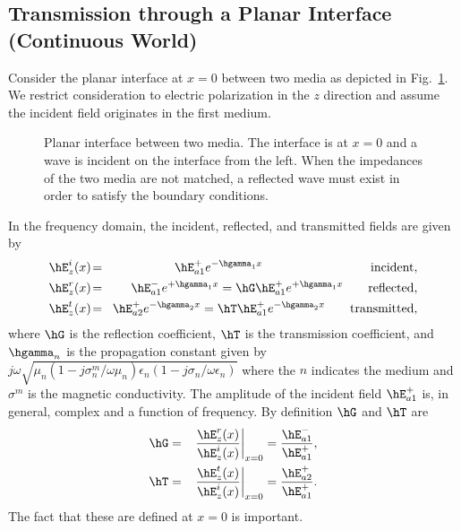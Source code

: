 \subsection[Transmission through Planar Interface]{Transmission through a
Planar Interface (Continuous World) \label{sec:contTrans}}

Consider the planar interface at $x=0$ between two media as depicted
in Fig.\ \ref{fig:planarInterface}.  We restrict consideration to
electric polarization in the $z$ direction and assume the incident
field originates in the first medium.
\begin{figure}
  \begin{center}
  \end{center}
  \caption{Planar interface between two media.  The interface is at
 $x=0$ and a wave is incident on the interface from the left.  When the
 impedances of the two media are not matched, a reflected wave must
 exist in order to satisfy the boundary conditions.}
  \label{fig:planarInterface}
\end{figure}
In the frequency domain, the incident, reflected, and transmitted
fields are given by
\begin{eqnarray}
  \hE_z^i(x) \!&=&\! \hE_{a1}^+ e^{-\hgamma_1 x} 
    \qquad \mbox{\hspace{.92in}incident},\\
  \hE_z^r(x) \!&=&\! \hE_{a1}^- e^{+\hgamma_1 x} =
                   \hG \hE_{a1}^+ e^{+\hgamma_1 x} \qquad \mbox{reflected},\\
  \hE_z^t(x) \!&=&\! \hE_{a2}^+ e^{-\hgamma_2 x} =
                   \hT \hE_{a1}^+ e^{-\hgamma_2 x} \qquad \mbox{transmitted},
\end{eqnarray}
where $\hG$ is the reflection coefficient, $\hT$ is the transmission
coefficient, and $\hgamma_n$ is the propagation constant given by
$j\omega\sqrt{\mu_n(1-j\sigma^m_n/\omega\mu_n)
  \epsilon_n(1-j\sigma_n/\omega\epsilon_n)}$ where the $n$ indicates
the medium and $\sigma^m$ is the magnetic conductivity.  The amplitude
of the incident field $\hE_{a1}^+$ is, in general, complex and a
function of frequency.  By definition $\hG$ and $\hT$ are
\begin{eqnarray}
  \hG &=& \left.\frac{\hE_z^r(x)}{\hE_z^i(x)}\right|_{x=0} =
              \frac{\hE_{a1}^-}{\hE_{a1}^+}, \\
       \hT &=& \left.\frac{\hE_z^t(x)}{\hE_z^i(x)}\right|_{x=0} = 
              \frac{\hE_{a2}^+}{\hE_{a1}^+}.
\end{eqnarray}
The fact that these are defined at $x=0$ is important.

